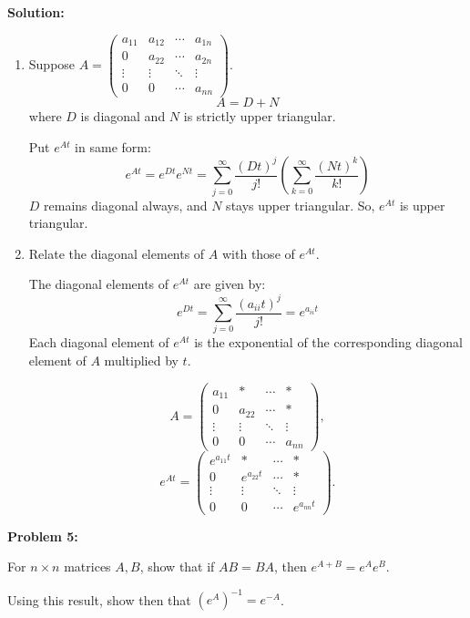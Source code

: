 \documentclass[12pt]{article}
\newenvironment{problem}[1]{
    \textbf{Problem #1:}
}{
    \rmfamily \vspace{1em}
}
\newenvironment{solution}{
    \textbf{Solution:}
    
}{
    
    \vspace{2em}
}
\begin{document}
\begin{solution}
    \begin{enumerate}[label=\alph*)]
        \item Suppose \(A = \begin{pmatrix}
            a_{11} & a_{12} & \cdots & a_{1n} \\
            0 & a_{22} & \cdots & a_{2n} \\
            \vdots & \vdots & \ddots & \vdots \\
            0 & 0 & \cdots & a_{nn}
        \end{pmatrix}\).
        \[
            A = D + N
        \]
        where \(D\) is diagonal and \(N\) is strictly upper triangular.

        Put \(e^{At}\) in same form:
        \[
            e^{At} = e^{Dt}e^{Nt} = \sum_{j=0}^\infty \frac{(Dt)^j}{j!} \left(\sum_{k=0}^\infty \frac{(Nt)^k}{k!}\right)
        \]
        \(D\) remains diagonal always, and \(N\) stays upper triangular. So, \(e^{At}\) is upper triangular.

        \item Relate the diagonal elements of \(A\) with those of \(e^{At}\).


The diagonal elements of \(e^{At}\) are given by:
\[
e^{Dt} = \sum_{j=0}^{\infty} \frac{(a_{ii} t)^j}{j!} = e^{a_{ii} t}
\]
Each diagonal element of \(e^{At}\) is the exponential of the corresponding diagonal element of \(A\) multiplied by \(t\). 

\[
A = \begin{pmatrix}
a_{11} & * & \cdots & * \\
0 & a_{22} & \cdots & * \\
\vdots & \vdots & \ddots & \vdots \\
0 & 0 & \cdots & a_{nn}
\end{pmatrix},
\]
\[
e^{At} = \begin{pmatrix}
e^{a_{11} t} & * & \cdots & * \\
0 & e^{a_{22} t} & \cdots & * \\
\vdots & \vdots & \ddots & \vdots \\
0 & 0 & \cdots & e^{a_{nn} t}
\end{pmatrix}.
\]

    \end{enumerate}
    
\end{solution}

\newpage

\begin{problem}{5}
    For \(n \times n\) matrices \(A, B\), show that if \(AB = BA\), then \(e^{A+B} = e^A e^B\).

    Using this result, show then that \((e^A)^{-1} = e^{-A}\).
\end{problem}
\end{document}
